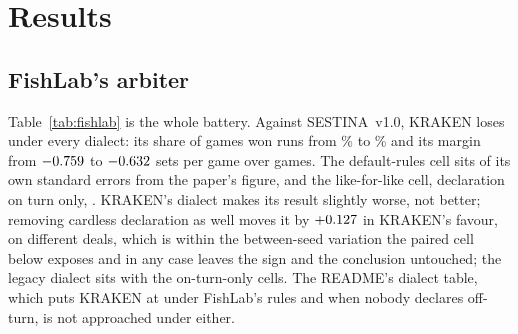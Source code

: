 \documentclass[11pt]{article}
\newcommand{\sestina}{\mbox{SESTINA v1.0}}
\newcommand{\pct}{\%}
\begin{document}
\section{Results}

\subsection{FishLab's arbiter}
\label{sec:fishlab}

\begin{table}[!ht]
\caption{Every cell of the FishLab battery. Blocks of 100 deals $\times$ 6 rotations; intervals are
Student~$t$ on block means. ``F-cheap'' is FishBot v0.6 with \sestina{}'s search switched on.}
\label{tab:fishlab}
\small

\end{table}

Table~\ref{tab:fishlab} is the whole battery. Against \sestina{}, KRAKEN loses under every dialect:
its share of games won runs from \kcESestinaWinMin\pct{} to \kcESestinaWinMax\pct{} and its margin
from $-0.759$ to $-0.632$ sets per game over \kcESestinaGames{} games.
The default-rules cell sits \kcEDefaultSEsFromClaim{} of its own standard errors from the paper's
figure, and the like-for-like cell, declaration on turn only, \kcENoootSEsFromClaim{}. KRAKEN's
dialect makes its result slightly worse, not better; removing cardless declaration as well moves it by
$+0.127$ in KRAKEN's favour, on different deals, which is within the between-seed variation
the paired cell below exposes and in any case leaves the sign and the conclusion untouched; the legacy
dialect sits with the on-turn-only cells. The README's dialect table, which puts KRAKEN at
\kcReadmeBoth{} under FishLab's rules and \kcReadmeNobody{} when nobody declares off-turn, is not
approached under either.
\end{document}
